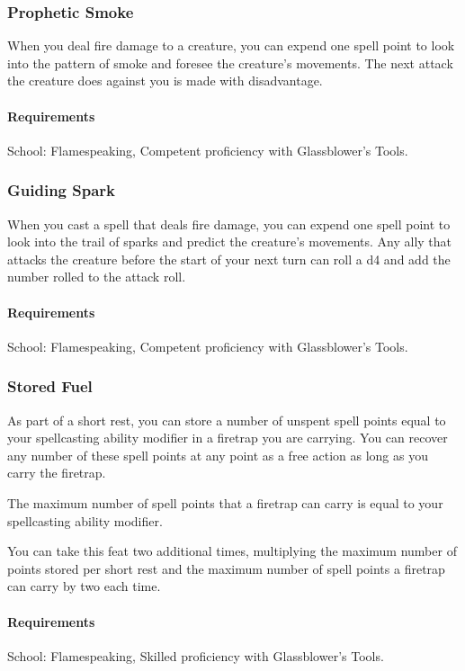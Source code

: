 \subsubsection{Prophetic Smoke} \label{feat::propheticsmoke}
    When you deal fire damage to a creature, you can expend one spell point to look into the pattern of smoke and foresee the creature's movements.
    The next attack the creature does against you is made with disadvantage.
    \paragraph{Requirements} School: Flamespeaking, Competent proficiency with Glassblower's Tools.
\subsubsection{Guiding Spark} \label{feat::guidingspark}
    When you cast a spell that deals fire damage, you can expend one spell point to look into the trail of sparks and predict the creature's movements.
    Any ally that attacks the creature before the start of your next turn can roll a d4 and add the number rolled to the attack roll.
    \paragraph{Requirements} School: Flamespeaking, Competent proficiency with Glassblower's Tools.
\subsubsection{Stored Fuel} \label{feat::storedfuel}
    As part of a short rest, you can store a number of unspent spell points equal to your spellcasting ability modifier in a firetrap you are carrying.
    You can recover any number of these spell points at any point as a free action as long as you carry the firetrap.

    The maximum number of spell points that a firetrap can carry is equal to your spellcasting ability modifier.

    You can take this feat two additional times, multiplying the maximum number of points stored per short rest and the maximum number of spell points a firetrap can carry by two each time.
    \paragraph{Requirements} School: Flamespeaking, Skilled proficiency with Glassblower's Tools.
